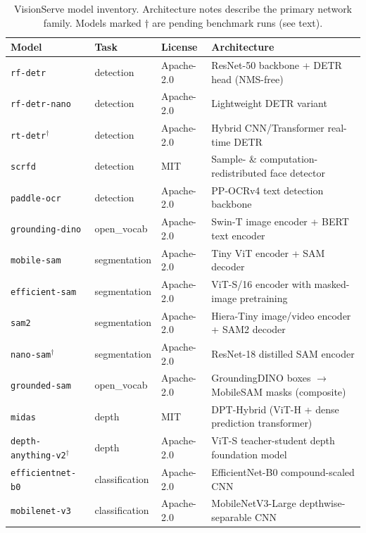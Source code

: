 \begin{table}[t]
  \centering
  \small
  \caption{%
    VisionServe model inventory.
    Architecture notes describe the primary network family.
    Models marked $\dagger$ are pending benchmark runs (see text).%
  }
  \label{tab:model-inventory}
  \begin{tabular}{llll}
    \toprule
    \textbf{Model} & \textbf{Task} & \textbf{License} & \textbf{Architecture} \\
    \midrule
    \texttt{rf-detr}          & detection     & Apache-2.0 & ResNet-50 backbone + DETR head (NMS-free) \\
    \texttt{rf-detr-nano}     & detection     & Apache-2.0 & Lightweight DETR variant \\
    \texttt{rt-detr}$^\dagger$& detection     & Apache-2.0 & Hybrid CNN/Transformer real-time DETR \\
    \texttt{scrfd}            & detection     & MIT        & Sample- \& computation-redistributed face detector \\
    \texttt{paddle-ocr}       & detection     & Apache-2.0 & PP-OCRv4 text detection backbone \\
    \texttt{grounding-dino}   & open\_vocab   & Apache-2.0 & Swin-T image encoder + BERT text encoder \\
    \texttt{mobile-sam}       & segmentation  & Apache-2.0 & Tiny ViT encoder + SAM decoder \\
    \texttt{efficient-sam}    & segmentation  & Apache-2.0 & ViT-S/16 encoder with masked-image pretraining \\
    \texttt{sam2}             & segmentation  & Apache-2.0 & Hiera-Tiny image/video encoder + SAM2 decoder \\
    \texttt{nano-sam}$^\dagger$& segmentation & Apache-2.0 & ResNet-18 distilled SAM encoder \\
    \texttt{grounded-sam}    & open\_vocab    & Apache-2.0 & GroundingDINO boxes $\to$ MobileSAM masks (composite) \\
    \texttt{midas}            & depth         & MIT        & DPT-Hybrid (ViT-H + dense prediction transformer) \\
    \texttt{depth-anything-v2}$^\dagger$ & depth & Apache-2.0 & ViT-S teacher-student depth foundation model \\
    \texttt{efficientnet-b0}  & classification& Apache-2.0 & EfficientNet-B0 compound-scaled CNN \\
    \texttt{mobilenet-v3}     & classification& Apache-2.0 & MobileNetV3-Large depthwise-separable CNN \\

\end{tabular}
\end{table}
